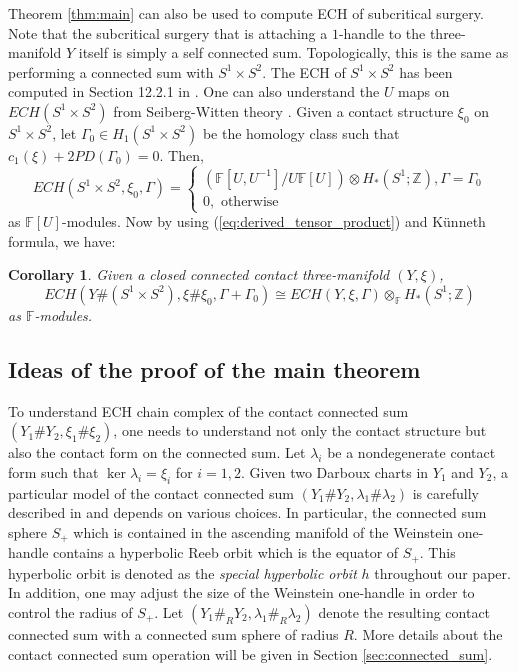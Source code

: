 \documentclass{article}
\numberwithin{equation}{section}
\newtheorem{corollary}[theorem]{Corollary}
\theoremstyle{definition}
\newcommand{\Z}{\mathbb{Z}}
\newcommand{\F}{\mathbb{F}}
\begin{document}
Theorem \ref{thm:main} can also be used to compute ECH of subcritical surgery. Note that the subcritical surgery that is attaching a $1$-handle to the three-manifold $Y$ itself is simply a self connected sum. Topologically, this is the same as performing a connected sum with $S^1 \times S^2$. The ECH of $S^1 \times S^2$ has been computed in Section 12.2.1 in \cite{T3}. One can also understand the $U$ maps on $ECH(S^1 \times S^2)$ from Seiberg-Witten theory \cite[Section 36]{Kronheimer_Mrowka}. Given a contact structure $\xi_0$ on $S^1 \times S^2$, let $\Gamma_0\in H_1(S^1\times S^2)$ be the homology class such that $c_1(\xi)+2PD(\Gamma_0) = 0$. Then, 
$$ECH(S^1 \times S^2, \xi_{0}, \Gamma) = 
\begin{cases}
(\F[U, U^{-1}]/U\F[U]) \otimes H_*(S^1;\Z), \Gamma = \Gamma_0\\
0, \text{ otherwise}
\end{cases}$$ 
as $\F[U]$-modules. Now by using (\ref{eq:derived_tensor_product}) and K\"{u}nneth formula, we have:
\begin{corollary}
Given a closed connected contact three-manifold $(Y, \xi)$,
$$ECH(Y \# (S^1 \times S^2), \xi \# \xi_0, \Gamma+\Gamma_0) \cong ECH(Y, \xi, \Gamma) \otimes_{\F} H_*(S^1;\Z)$$
as $\F$-modules.
\end{corollary}

         
\subsection{Ideas of the proof of the main theorem}
To understand ECH chain complex of the contact connected sum $(Y_1 \# Y_2, \xi_1 \# \xi_2)$, one needs to understand not only the contact structure but also the contact form on the connected sum. Let $\lambda_i$ be a nondegenerate contact form such that $\ker{\lambda_i} = \xi_i$ for $i=1,2$. Given two Darboux charts in $Y_1$ and $Y_2$, a particular model of the contact connected sum $(Y_1 \# Y_2, \lambda_1 \# \lambda_2)$ is carefully described in \cite{Fish_Siefring} and depends on various choices. In particular, the connected sum sphere $S_+$ which is contained in the ascending manifold of the Weinstein one-handle contains a hyperbolic Reeb orbit which is the equator of $S_+$. This hyperbolic orbit is denoted as the \emph{special hyperbolic orbit} $h$ throughout our paper. In addition, one may adjust the size of the Weinstein one-handle in order to control the radius of $S_+$. Let $(Y_1 \#_{R} Y_2, \lambda_1 \#_R \lambda_2)$ denote the resulting contact connected sum with a connected sum sphere of radius $R$. More details about the contact connected sum operation will be given in Section \ref{sec:connected_sum}. 
\end{document}
